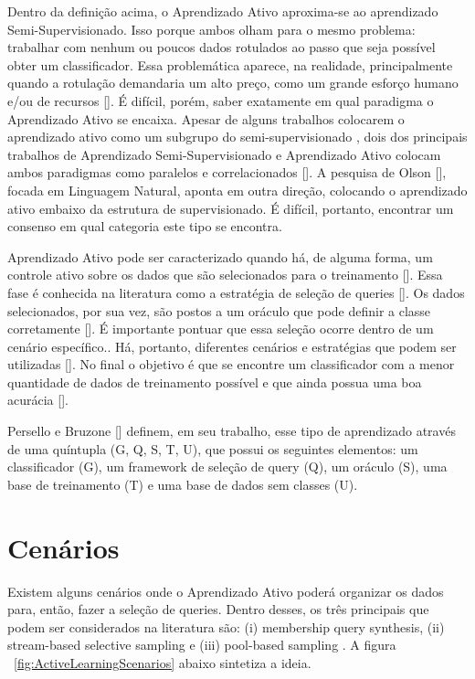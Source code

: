 Dentro da definição acima, o Aprendizado Ativo aproxima-se ao aprendizado Semi-Supervisionado. Isso porque ambos olham para o mesmo problema: trabalhar com nenhum ou poucos dados rotulados ao passo que seja possível obter um classificador. Essa problemática aparece, na realidade, principalmente quando a rotulação demandaria um alto preço, como um grande esforço humano e/ou de recursos [\cite{settles2012active}]. É difícil, porém, saber exatamente em qual paradigma o Aprendizado Ativo se encaixa. Apesar de alguns trabalhos colocarem o aprendizado ativo como um subgrupo do semi-supervisionado , dois dos principais trabalhos de Aprendizado Semi-Supervisionado e Aprendizado Ativo colocam ambos paradigmas como paralelos e correlacionados [\cite{settles2012active, zhu2006semi}]. A pesquisa de Olson [\cite{olsson2009literature}], focada em Linguagem Natural, aponta em outra direção, colocando o aprendizado ativo embaixo da estrutura de supervisionado. É difícil, portanto, encontrar um consenso em qual categoria este tipo se encontra.

Aprendizado Ativo pode ser caracterizado quando há, de alguma forma, um controle ativo sobre os dados que são selecionados para o treinamento [\cite{cohn1994improving}]. Essa fase é conhecida na literatura como a estratégia de seleção de queries [\cite{settles2014active}]. Os dados selecionados, por sua vez, são postos a um oráculo que pode definir a classe corretamente [\cite{olsson2009literature}]. É importante pontuar que essa seleção ocorre dentro de um cenário específico.. Há, portanto, diferentes cenários e estratégias que podem ser utilizadas [\cite{settles2014active}]. No final o objetivo é que se encontre um classificador com a menor quantidade de dados de treinamento possível e que ainda possua uma boa acurácia [\cite{dasgupta2011two}].

Persello e Bruzone [\cite{persello2012active}] definem, em seu trabalho, esse tipo de aprendizado através de uma quíntupla (G, Q, S, T, U), que possui os seguintes elementos: um classificador (G), um framework de seleção de query (Q), um oráculo (S), uma base de treinamento (T) e uma base de dados sem classes (U). 

\section{Cenários}
\label{sec:cenarios}

Existem alguns cenários onde o Aprendizado Ativo poderá organizar os dados para, então, fazer a seleção de queries. Dentro desses, os três principais que podem ser considerados na literatura são: (i) membership query synthesis, (ii) stream-based selective sampling e (iii) pool-based sampling \cite{settles2014active}. A figura ~\ref{fig:ActiveLearningScenarios} abaixo sintetiza a ideia.


